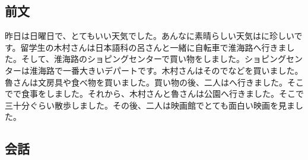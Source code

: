 \documentclass[a5j]{ltjtarticle}
\begin{document}
\subsection*{前文}

昨日は日曜日で、とてもいい天気でした。あんなに素晴らしい天気はに珍しいです。留学生の木村さんは日本語科の呂さんと一緒に自転車で淮海路へ行きました。そして、淮海路のショピングセンターで買い物をしました。ショピングセンターは淮海路で一番大きいデパートです。木村さんはそのでなどを買いました。魯さんは文房具や食べ物を買いました。買い物の後、二人はへ行きました。そこでで食事をしました。それから、木村さんと魯さんは公園へ行きました。そこで三十分ぐらい散歩しました。その後、二人は映画館でとても面白い映画を見ました。

\subsection*{会話}
\end{document}
